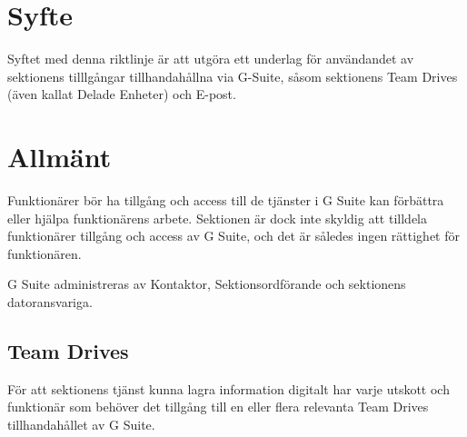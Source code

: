 \documentclass[10pt]{article}
\begin{document}
    \section*{\doctitle}
    \vspace{6px}

    \section{Syfte}
    \vspace{6px}
    
    Syftet med denna riktlinje är att utgöra ett underlag för användandet av sektionens tilllgångar tillhandahållna via G-Suite, såsom sektionens Team Drives (även kallat Delade Enheter) och E-post. 
    
    \vspace{6px}
    \section{Allmänt}
    \vspace{6px}

    Funktionärer bör ha tillgång och access till de tjänster i G Suite kan förbättra eller hjälpa funktionärens arbete. 
    Sektionen är dock inte skyldig att tilldela funktionärer tillgång och access av G Suite, och det är således ingen rättighet för funktionären. 
 
    G Suite administreras av Kontaktor, Sektionsordförande och sektionens datoransvariga. 
    
    \vspace{3px}
    \subsection{Team Drives}
    \vspace{3px}

    För att sektionens tjänst kunna lagra information digitalt har varje utskott och funktionär som behöver det tillgång till en eller flera relevanta Team Drives tillhandahållet av G Suite. 
\end{document}
